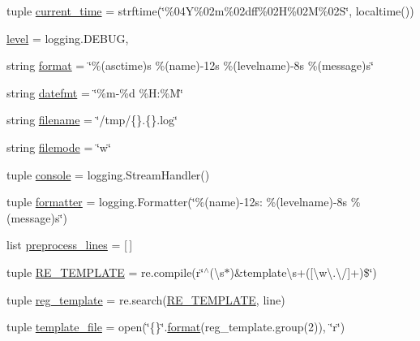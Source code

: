 \begin{DoxyCompactItemize}
\item 
tuple \hyperlink{namespaceverilog__generator_ad05f0f3ac407424a9c5a520b2273bc80}{current\-\_\-time} = strftime(\char`\"{}\%04\-Y\%02m\%02dff\%02\-H\%02\-M\%02\-S\char`\"{}, localtime())
\item 
\hyperlink{namespaceverilog__generator_ac7e32195323e3b3286dde555fd14edb5}{level} = logging.\-D\-E\-B\-U\-G,
\item 
string \hyperlink{namespaceverilog__generator_a15bd2d3bf5324274289ab73246b585bf}{format} = \char`\"{}\%(asctime)s \%(name)-\/12s \%(levelname)-\/8s \%(message)s\char`\"{}
\item 
string \hyperlink{namespaceverilog__generator_a017c98333edf5962930aae34c94472d7}{datefmt} = \char`\"{}\%m-\/\%d \%H\-:\%M\char`\"{}
\item 
string \hyperlink{namespaceverilog__generator_a74645f88578da230e576aaf69299fa2d}{filename} = \char`\"{}/tmp/\{\}.\{\}.log\char`\"{}
\item 
string \hyperlink{namespaceverilog__generator_a36e53540e6ae38d5e5e1d87cba949016}{filemode} = \char`\"{}w\char`\"{}
\item 
tuple \hyperlink{namespaceverilog__generator_a734fc03a4db18f8e5c63129ffcda83a9}{console} = logging.\-Stream\-Handler()
\item 
tuple \hyperlink{namespaceverilog__generator_acadbc9500b6eafb53dca88de5dd2ca81}{formatter} = logging.\-Formatter(\char`\"{}\%(name)-\/12s\-: \%(levelname)-\/8s \%(message)s\char`\"{})
\item 
list \hyperlink{namespaceverilog__generator_ad5eb8554969365fa9ee5b1fb34933f60}{preprocess\-\_\-lines} = \mbox{[}$\,$\mbox{]}
\item 
tuple \hyperlink{namespaceverilog__generator_a6f7123cb341845c3498a34ba5e3c0067}{R\-E\-\_\-\-T\-E\-M\-P\-L\-A\-T\-E} = re.\-compile(r\char`\"{}$^\wedge$(\textbackslash{}s$\ast$)\&template\textbackslash{}s+(\mbox{[}\textbackslash{}w\textbackslash{}.\textbackslash{}/\mbox{]}+)\$\char`\"{})
\item 
tuple \hyperlink{namespaceverilog__generator_a3aed3c5cd303298b2bb45f71638c1e0a}{reg\-\_\-template} = re.\-search(\hyperlink{namespaceverilog__generator_a6f7123cb341845c3498a34ba5e3c0067}{R\-E\-\_\-\-T\-E\-M\-P\-L\-A\-T\-E}, line)
\item 
tuple \hyperlink{namespaceverilog__generator_a3333ead908a28b77546390c93f38929f}{template\-\_\-file} = open(\char`\"{}\{\}\char`\"{}.\hyperlink{namespaceverilog__generator_a15bd2d3bf5324274289ab73246b585bf}{format}(reg\-\_\-template.\-group(2)), \char`\"{}r\char`\"{})

\end{DoxyCompactItemize}
